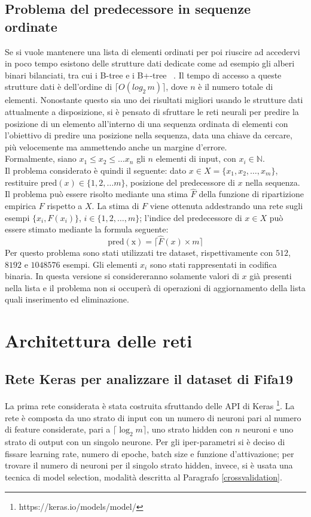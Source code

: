 \documentclass[12pt]{report}
\begin{document}
\subsection{Problema del predecessore in sequenze ordinate}\label{probPred}
Se si vuole mantenere una lista di elementi ordinati per poi riuscire ad accedervi in poco tempo esistono delle strutture dati dedicate come ad esempio gli alberi binari bilanciati, tra cui i B-tree e i B+-tree ~\cite{BTree}. Il tempo di accesso a queste strutture dati è dell'ordine di $\lceil O(log_2\,m) \rceil$, dove $n$ è il numero totale di elementi. Nonostante questo sia uno dei risultati migliori usando le strutture dati attualmente a disposizione, si è pensato di sfruttare le reti neurali per predire la posizione di un elemento all'interno di una sequenza ordinata di elementi con l'obiettivo di predire una posizione nella sequenza, data una chiave da cercare, più velocemente ma ammettendo anche un margine d'errore. \\
Formalmente, siano $x_1 \leq x_2 \leq \dots x_n$ gli $n$ elementi di input, con $x_i \in \mathbb{N}$.\\
Il problema considerato è quindi il seguente: dato $x \in X = \{x_1, x_2, \dots, x_m\}$, restituire $\mathrm{pred}(x) \in \{1, 2, \dots m\}$, posizione del predecessore di $x$ nella sequenza.
Il problema può essere risolto mediante una stima $\hat{F}$ della funzione di ripartizione empirica $F$ rispetto a $X$. La stima di $F$ viene ottenuta addestrando una rete sugli esempi $\{x_i, F(x_i)\}$, $i \in \{1, 2, \dots, m \}$; l'indice del predecessore di $x \in X$ può essere stimato mediante la formula seguente:
\begin{equation}
\mathrm{pred(x)} = \lceil\hat{F}(x)\times m\rceil
\label{empirical}
\end{equation}
Per questo problema sono stati utilizzati tre dataset, rispettivamente con $512$, $8192$ e $1048576$ esempi. Gli elementi $x_i$ sono stati rappresentati in codifica binaria. In questa versione si considereranno solamente valori di $x$ già presenti nella lista e il problema non si occuperà di operazioni di aggiornamento della lista quali inserimento ed eliminazione.

\section{Architettura delle reti}\label{architettura}
\subsection{Rete Keras per analizzare il dataset di Fifa19}
La prima rete considerata è stata costruita sfruttando delle API di Keras \footnote{https://keras.io/models/model/}. La rete è composta da uno strato di input con un numero di neuroni pari al numero di feature considerate, pari a $\lceil\log_2 m\rceil$, uno strato hidden con $n$ neuroni e uno strato di output con un singolo neurone. Per gli iper-parametri si è deciso di fissare learning rate, numero di epoche, batch size e funzione d'attivazione; per trovare il numero di neuroni per il singolo strato hidden, invece, si è usata una tecnica di model selection, modalità descritta al Paragrafo \ref{crossvalidation}.
\end{document}
